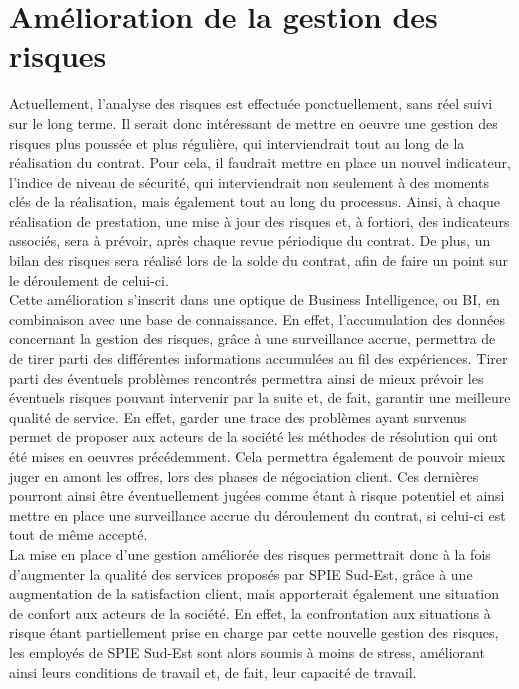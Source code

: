 \section{Amélioration de la gestion des risques}

Actuellement, l’analyse des risques est effectuée ponctuellement, sans réel suivi sur le long terme. Il serait donc intéressant de mettre en oeuvre une gestion des risques plus poussée et plus régulière, qui interviendrait tout au long de la réalisation du contrat. Pour cela, il faudrait mettre en place un nouvel indicateur, l’indice de niveau de sécurité, qui interviendrait non seulement à des moments clés de la réalisation, mais également tout au long du processus. Ainsi, à chaque réalisation de prestation, une mise à jour des risques et, à fortiori, des indicateurs associés, sera à prévoir, après chaque revue périodique du contrat. De plus, un bilan des risques sera réalisé lors de la solde du contrat, afin de faire un point sur le déroulement de celui-ci. \\

Cette amélioration s’inscrit dans une optique de Business Intelligence, ou BI, en combinaison avec une base de connaissance. En effet, l’accumulation des données concernant la gestion des risques, grâce à une surveillance accrue, permettra de de tirer parti des différentes informations accumulées au fil des expériences. Tirer parti des éventuels problèmes rencontrés permettra ainsi de mieux prévoir les éventuels risques pouvant intervenir par la suite et, de fait, garantir une meilleure qualité de service. En effet, garder une trace des problèmes ayant survenus permet de proposer aux acteurs de la société les méthodes de résolution qui ont été mises en oeuvres précédemment. Cela permettra également de pouvoir mieux juger en amont les offres, lors des phases de négociation client. Ces dernières pourront ainsi être éventuellement jugées comme étant à risque potentiel et ainsi mettre en place une surveillance accrue du déroulement du contrat, si celui-ci est tout de même accepté. \\

La mise en place d’une gestion améliorée des risques permettrait donc à la fois d’augmenter la qualité des services proposés par SPIE Sud-Est, grâce à une augmentation de la satisfaction client, mais apporterait également une situation de confort aux acteurs de la société. En effet, la confrontation aux situations à risque étant partiellement prise en charge par cette nouvelle gestion des risques, les employés de SPIE Sud-Est sont alors soumis à moins de stress, améliorant ainsi leurs conditions de travail et, de fait, leur capacité de travail.
